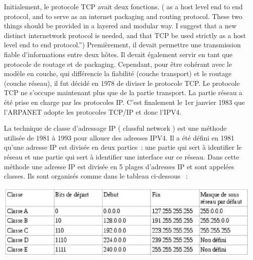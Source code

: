 \documentclass[twoside,openright,a4paper,11pt,french]{article}
\begin{document}
Initialement, le protocole TCP avait deux fonctions. ( as a host level end to end protocol, and to serve as an internet packaging and routing protocol. These two things should be provided in a layered and modular way. I suggest that a new distinct internetwork protocol is needed, and that TCP be used strictly as a host level end to end protocol.”) Premièrement, il devait permettre une transmission fiable d'informations entre deux hôtes. Il devait également servir en tant que protocole de routage et de packaging. Cependant, pour être cohérant avec le modèle en couche, qui différencie la fiabilité (couche transport) et le routage (couche réseau), il fut décidé en 1978 de diviser le protocole TCP. Le protocole TCP ne s'occupe maintenant plus que de la partie transport. La partie réseau a été prise en charge par les protocoles IP.
C'est finalement le 1er janvier 1983 que l'ARPANET adopte les protocoles TCP/IP et donc l'IPV4. 



La technique de classe d'adressage IP ( classful network ) est une méthode utilisée de 1981 à 1993 pour allouer des adresses IPV4. Il a été défini en 1981 qu'une adresse IP est divisée en deux parties : une partie qui sert à identifier le réseau et une partie qui sert à identifier une interface sur ce réseau.
Dans cette méthode une adresse IP est divisée en 5 plages d'adresses IP et sont appelées classes. Ils sont organisés comme dans le tableau ci-dessous  :

\includegraphics{./pics/tableau.eps}
\end{document}
